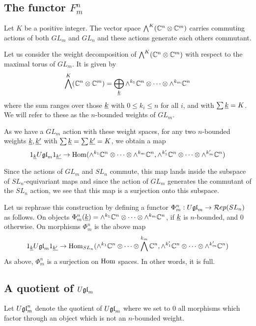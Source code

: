\documentclass[11pt,leqno]{article}
\begin{document}

\subsection{The functor $F_m^n$}
Let $K $ be a positive integer.  The vector space $ \bigwedge^K(\mathbb C^n \otimes \mathbb C^m) $ carries commuting actions of both $ GL_m $ and $ GL_n $ and these actions generate each others commutant.  

Let us consider the weight decomposition of $\bigwedge^K(\mathbb C^n \otimes \mathbb C^m)$  with respect to the maximal torus of $ GL_m $.  It is given by 
\begin{equation}
 \bigwedge^K(\mathbb C^n \otimes \mathbb C^m) = \bigoplus_{{\underline{k}}} \wedge^{k_1} \mathbb C^n \otimes \cdots \otimes \wedge^{k_m} \mathbb C^n
 \end{equation}
where the sum ranges over those $ {\underline{k}} $ with $ 0 \le k_i \le n $ for all $ i $, and with $\sum {\underline{k}} = K$.  We will refer to these as the $n$-bounded weights of $ GL_m$.

As we have a $ GL_m$ action with these weight spaces, for any two $n$-bounded weights $ {\underline{k}}, {\underline{k'}}$ with $ \sum {\underline{k}} = \sum {\underline{k'}} = K$, we obtain a map
$$
1_{\underline{k}} U\mathfrak{gl}_{m} 1_{\underline{k'}} \rightarrow \operatorname{Hom}(\wedge^{k_1} \mathbb C^n \otimes \cdots \otimes \wedge^{k_m} \mathbb C^n, \wedge^{k'_1} \mathbb C^n \otimes \cdots \otimes \wedge^{k'_m} \mathbb C^n)
$$

Since the actions of $GL_m $ and $ SL_n $ commute, this map lands inside the subspace of $ SL_n$-equivariant maps and since the action of $ GL_m$ generates the commutant of the $ SL_n $ action, we see that this map is a surjection onto this subspace.

Let us rephrase this construction by defining a functor $ \Phi_m^n : U\mathfrak{gl}_{m} \rightarrow \mathcal{R}ep(SL_{n}) $ as follows.  On objects $ \Phi_m^n({\underline{k}}) = \wedge^{k_1} \mathbb C^n \otimes \cdots \otimes \wedge^{k_m} \mathbb C^n $, if $ {\underline{k}} $ is $n$-bounded, and 0 otherwise.  On morphisms $ \Phi_m^n $ is the above map 
$$
1_{\underline{k}} U\mathfrak{gl}_{m} 1_{\underline{k'}} \rightarrow \operatorname{Hom}_{SL_n}(\wedge^{k_1} \mathbb C^n \otimes \cdots \otimes \bigwedge^{k_m} \mathbb C^n, \wedge^{k'_1} \mathbb C^n \otimes \cdots \otimes \wedge^{k'_m} \mathbb C^n)
$$
As above, $ \Phi_m^n $ is a surjection on $\operatorname{Hom}$ spaces.  In other words, it is full.

\subsection{A quotient of $U\mathfrak{gl}_{m}$}
Let $ U\mathfrak{gl}_{m}^n $ denote the quotient of $ U\mathfrak{gl}_{m} $ where we set to 0 all morphisms which factor through an object which is not an $n$-bounded weight.
\end{document}
